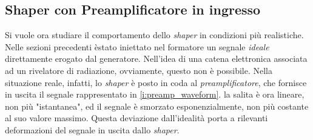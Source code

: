 \documentclass[a4paper,11pt]{article} %
\begin{document}
\subsection{Shaper con Preamplificatore in ingresso}\label{s:shaper_preamp}

Si vuole ora studiare il comportamento dello \textit{shaper} in condizioni più realistiche. Nelle sezioni precedenti
èstato iniettato nel formatore un segnale \textit{ideale} direttamente erogato dal generatore. Nell'idea di una catena
elettronica associata ad un rivelatore di radiazione, ovviamente, questo non è possibile. Nella situazione reale,
infatti, lo \textit{shaper} è posto in coda al \textit{preamplificatore}, che fornisce in uscita il segnale
rappresentato in \autoref{i:preamp_waveform}. la salita è ora lineare, non più "istantanea", ed il segnale è smorzato
esponenzialmente, non più costante al suo valore massimo. Questa deviazione dall'idealità porta a rilevanti deformazioni
del segnale in uscita dallo \textit{shaper}. 





\end{document}
